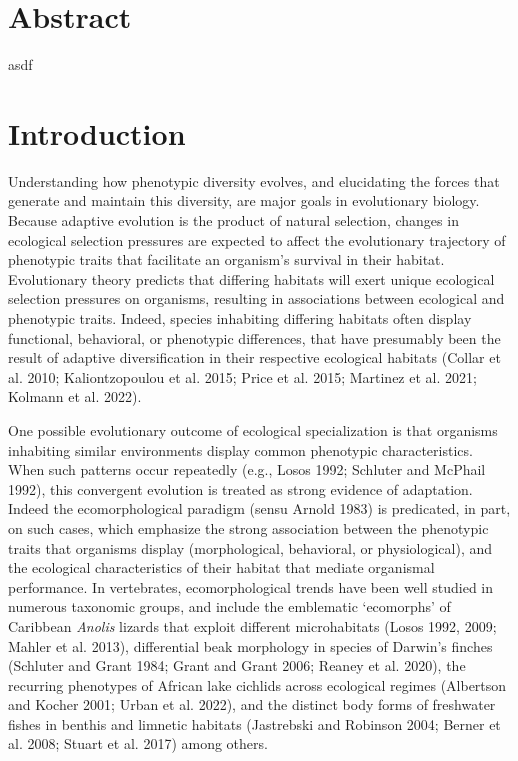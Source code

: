 \documentclass[
  11pt,
]{article}
\begin{document}
\newpage

\hypertarget{abstract}{%
\section{Abstract}\label{abstract}}

asdf

\newpage

\hypertarget{introduction}{%
\section{Introduction}\label{introduction}}

Understanding how phenotypic diversity evolves, and elucidating the
forces that generate and maintain this diversity, are major goals in
evolutionary biology. Because adaptive evolution is the product of
natural selection, changes in ecological selection pressures are
expected to affect the evolutionary trajectory of phenotypic traits that
facilitate an organism's survival in their habitat. Evolutionary theory
predicts that differing habitats will exert unique ecological selection
pressures on organisms, resulting in associations between ecological and
phenotypic traits. Indeed, species inhabiting differing habitats often
display functional, behavioral, or phenotypic differences, that have
presumably been the result of adaptive diversification in their
respective ecological habitats (Collar et al. 2010; Kaliontzopoulou et
al. 2015; Price et al. 2015; Martinez et al. 2021; Kolmann et al. 2022).
\hfill\break

One possible evolutionary outcome of ecological specialization is that
organisms inhabiting similar environments display common phenotypic
characteristics. When such patterns occur repeatedly (e.g., Losos 1992;
Schluter and McPhail 1992), this convergent evolution is treated as
strong evidence of adaptation. Indeed the ecomorphological paradigm
(sensu Arnold 1983) is predicated, in part, on such cases, which
emphasize the strong association between the phenotypic traits that
organisms display (morphological, behavioral, or physiological), and the
ecological characteristics of their habitat that mediate organismal
performance. In vertebrates, ecomorphological trends have been well
studied in numerous taxonomic groups, and include the emblematic
`ecomorphs' of Caribbean \emph{Anolis} lizards that exploit different
microhabitats (Losos 1992, 2009; Mahler et al. 2013), differential beak
morphology in species of Darwin's finches (Schluter and Grant 1984;
Grant and Grant 2006; Reaney et al. 2020), the recurring phenotypes of
African lake cichlids across ecological regimes (Albertson and Kocher
2001; Urban et al. 2022), and the distinct body forms of freshwater
fishes in benthis and limnetic habitats (Jastrebski and Robinson 2004;
Berner et al. 2008; Stuart et al. 2017) among others. \hfill\break
\end{document}
